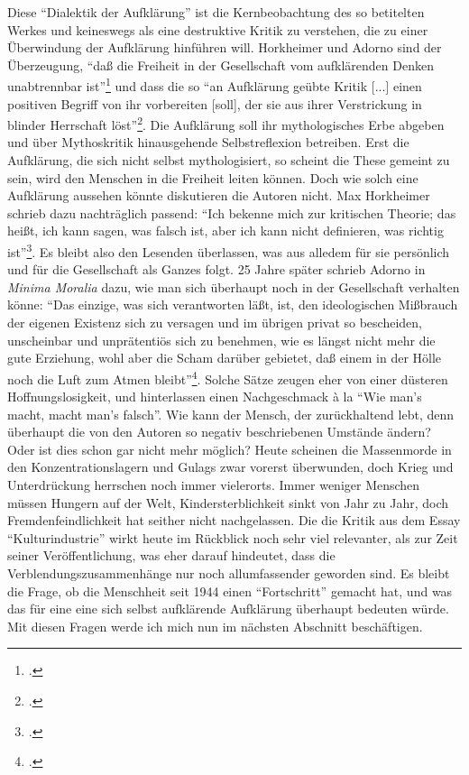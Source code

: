 \documentclass[a4paper, 12pt]{article}
\begin{document}
\begin{onehalfspace}
Diese "`Dialektik der Aufklärung"' ist die Kernbeobachtung des so betitelten Werkes und keineswegs als eine destruktive Kritik zu verstehen, die zu einer Überwindung der Aufklärung hinführen will. Horkheimer und Adorno sind der Überzeugung, "`daß die Freiheit in der Gesellschaft vom aufklärenden Denken unabtrennbar ist"'\footnote{\Cite[Siehe][S. 3]{dialektik-der-aufklaerung}.} und dass die so "`an Aufklärung geübte Kritik [...] einen positiven Begriff von ihr vorbereiten [soll], der sie aus ihrer Verstrickung in blinder Herrschaft löst"'\footnote{\Cite[Siehe][S. 6]{dialektik-der-aufklaerung}.}. Die Aufklärung soll ihr mythologisches Erbe abgeben und über Mythoskritik hinausgehende Selbstreflexion betreiben. Erst die Aufklärung, die sich nicht selbst mythologisiert, so scheint die These gemeint zu sein, wird den Menschen in die Freiheit leiten können. Doch wie solch eine Aufklärung aussehen könnte diskutieren die Autoren nicht. Max Horkheimer schrieb dazu nachträglich passend: "`Ich bekenne mich zur kritischen Theorie; das heißt, ich kann sagen, was falsch ist, aber ich kann nicht definieren, was richtig ist"'\footnote{\Cite[Siehe][S. 150]{gesellschaft}.}. Es bleibt also den Lesenden überlassen, was aus alledem für sie persönlich und für die Gesellschaft als Ganzes folgt. 25 Jahre später schrieb Adorno in \emph{Minima Moralia} dazu, wie man sich überhaupt noch in der Gesellschaft verhalten könne: "`Das einzige, was sich verantworten läßt, ist, den ideologischen Mißbrauch der eigenen Existenz sich zu versagen und im übrigen privat so bescheiden, unscheinbar und unprätentiös sich zu benehmen, wie es längst nicht mehr die gute Erziehung, wohl aber die Scham darüber gebietet, daß einem in der Hölle noch die Luft zum Atmen bleibt"'\footnote{\Cite[Siehe][S. XXX]{minima}.}. Solche Sätze zeugen eher von einer düsteren Hoffnungslosigkeit, und hinterlassen einen Nachgeschmack \`{a} la "`Wie man's macht, macht man's falsch"'. Wie kann der Mensch, der zurückhaltend lebt, denn überhaupt die von den Autoren so negativ beschriebenen Umstände ändern? Oder ist dies schon gar nicht mehr möglich? Heute scheinen die Massenmorde in den Konzentrationslagern und Gulags zwar vorerst überwunden, doch Krieg und Unterdrückung herrschen noch immer vielerorts. Immer weniger Menschen müssen Hungern auf der Welt, Kindersterblichkeit sinkt von Jahr zu Jahr, doch Fremdenfeindlichkeit hat seither nicht nachgelassen. Die die Kritik aus dem Essay "`Kulturindustrie"' wirkt heute im Rückblick noch sehr viel relevanter, als zur Zeit seiner Veröffentlichung, was eher darauf hindeutet, dass die Verblendungszusammenhänge nur noch allumfassender geworden sind. Es bleibt die Frage, ob die Menschheit seit 1944 einen "`Fortschritt"' gemacht hat, und was das für eine eine sich selbst aufklärende Aufklärung überhaupt bedeuten würde. Mit diesen Fragen werde ich mich nun im nächsten Abschnitt beschäftigen.


\end{onehalfspace}
\end{document}
